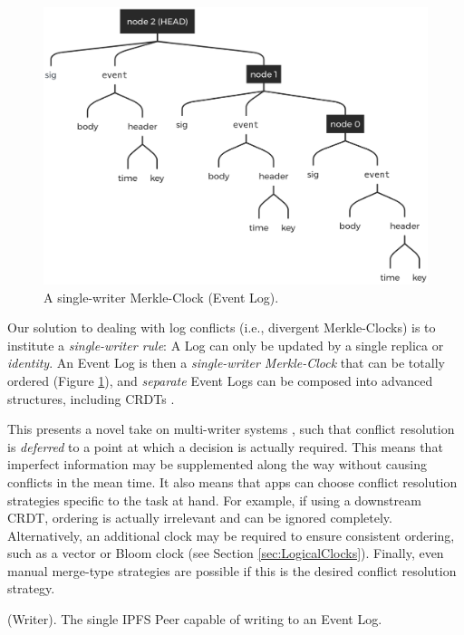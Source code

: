 \documentclass{textile}
\begin{document}
\begin{figure}[!t]
  \includegraphics[width=\linewidth]{figures/Event_Log.png}
  \caption{A single-writer Merkle-Clock (Event Log).}
  \label{fig:EventLog}
\end{figure}

Our solution to dealing with log conflicts (i.e., divergent Merkle-Clocks) is to institute a \emph{single-writer rule}: A Log can only be updated by a single replica or \emph{identity}. An Event Log is then a \emph{single-writer Merkle-Clock} that can be totally ordered (Figure \ref{fig:EventLog}), and \emph{separate} Event Logs can be composed into advanced structures, including CRDTs \cite{enesSingleWriterPrincipleCRDT2017}.

This presents a novel take on multi-writer systems \cite{enesSingleWriterPrincipleCRDT2017}, such that conflict resolution is \emph{deferred} to a point at which a decision is actually required. This means that imperfect information may be supplemented along the way without causing conflicts in the mean time. It also means that apps can choose conflict resolution strategies specific to the task at hand. For example, if using a downstream CRDT, ordering is actually irrelevant and can be ignored completely. Alternatively, an additional clock may be required to ensure consistent ordering, such as a vector or Bloom clock (see Section \ref{sec:LogicalClocks}). Finally, even manual merge-type strategies are possible if this is the desired conflict resolution strategy.

\begin{definition}
(Writer). The single IPFS Peer capable of writing to an Event Log.
\end{definition}
\end{document}
